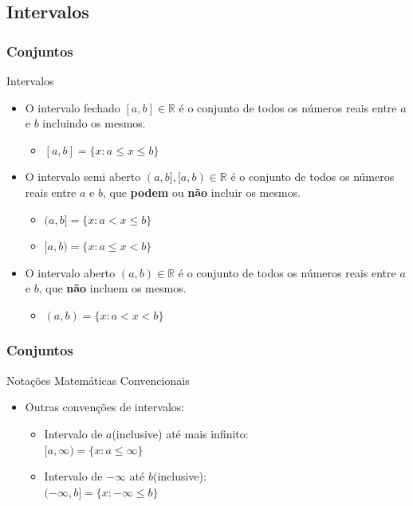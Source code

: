 \documentclass{beamer}
\begin{document}
\subsection{Intervalos}
\begin{frame}
\frametitle{Conjuntos}


	\begin{block}{Intervalos}
		\begin{itemize}
			\item<1-> O intervalo fechado $[a,b] \in \mathbb{R}$ é o conjunto de todos os números reais entre $a$ e $b$ incluindo os mesmos.
			\begin{itemize}
				\item $[a,b] = \{ x : a \leq x \leq b \}$
			\end{itemize}
			
			\item<2-> O intervalo semi aberto $(a,b],[a,b) \in \mathbb{R}$ é o conjunto de todos os números reais entre $a$ e $b$, que \textbf{podem} ou \textbf{não} incluir os mesmos.
			\begin{itemize}
				\item $(a,b] = \{ x : a < x \leq b \}$
				\item $[a,b) = \{ x : a \leq x < b \}$
			\end{itemize}
			
			\item<3-> O intervalo aberto $(a,b) \in \mathbb{R}$ é o conjunto de todos os números reais entre $a$ e $b$, que \textbf{não} incluem os mesmos.
			\begin{itemize}
				\item $(a,b) = \{ x : a < x < b \}$
			\end{itemize}
		\end{itemize}
	\end{block}
	
\end{frame}


\begin{frame}
\frametitle{Conjuntos}


	\begin{block}{Notações Matemáticas Convencionais}
		\begin{itemize}
			\item Outras convenções de intervalos:
				\begin{itemize}
					\item<1-> Intervalo de $a$(inclusive) até mais infinito:\\$[a,\infty) = \{ x : a \leq \infty \}$
					\item<2-> Intervalo de $-\infty$ até $b$(inclusive):\\$(-\infty,b] = \{ x : -\infty \leq b \}$
				\end{itemize}
		\end{itemize}
	\end{block}
	
\end{frame}
\end{document}
